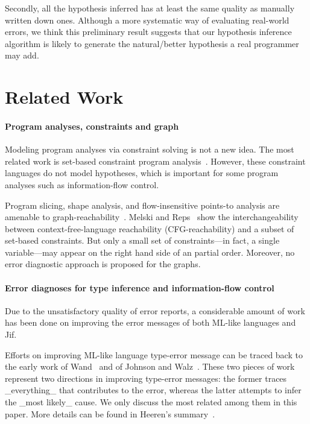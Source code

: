Secondly, all the hypothesis inferred has at least the same quality as
manually written down ones. Although a more systematic way of
evaluating real-world errors, we think this preliminary result
suggests that our hypothesis inference algorithm is likely to generate
the natural/better hypothesis a real programmer may add.
 
\section{Related Work}

\paragraph{Program analyses, constraints and graph} 

Modeling program analyses via constraint solving is not a new idea.
The most related work is set-based constraint program
analysis~\cite{aiken-setconstraint, aiken-typeinclusion}.  However,
these constraint languages do not model hypotheses, which is important
for some program analyses such as information-flow control.
 
Program slicing, shape analysis, and flow-insensitive points-to
analysis are amenable to graph-reachability~\cite{reps-graph}. Melski
and Reps~\cite{melski-cflgraph} show the interchangeability between
context-free-language reachability (CFG-reachability) and a subset of
set-based constraints. But only a small set of constraints---in fact,
a single variable---may appear on the right hand side of an partial
order. Moreover, no error diagnostic approach is proposed for the
graphs.

\paragraph{Error diagnoses for type inference
	    and information-flow control} 

Due to the unsatisfactory quality of error reports, a considerable
amount of work has been done on improving the error messages of both
ML-like languages and Jif.

Efforts on improving ML-like language type-error message can be
traced back to the early work of Wand~\cite{wand-errorfinding} and
of Johnson and Walz~\cite{johnson-popl86}. These two pieces of work
represent two directions in improving type-error messages: the former
traces _everything_ that contributes to the error, whereas the
latter attempts to infer the _most likely_ cause. We only discuss the
most related among them in this paper. More details can be found in
Heeren's summary~\cite{heeren:thesis}.

